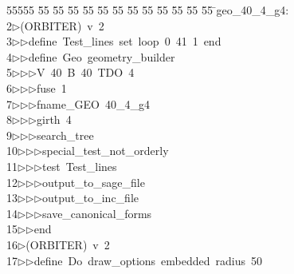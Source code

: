 %
%
\begin{tabbing}
55555 \= 55 \= 55 \= 55 \= 55 \= 55 \= 55 \= 55 \= 55 \= 55 \= 55 \= 55 \= 55 \= \>geo\_40\_4\_g4:\\[0pt]
2\>$\triangleright$\>(ORBITER)\ v\ 2\ \\[0pt]
3\>$\triangleright$\>$\triangleright$\>define\ Test\_lines\ set\ loop\ 0\ 41\ 1\ end\ \\[0pt]
4\>$\triangleright$\>$\triangleright$\>define\ Geo\ geometry\_builder\ \\[0pt]
5\>$\triangleright$\>$\triangleright$\>$\triangleright$\>V\ 40\ B\ 40\ TDO\ 4\ \\[0pt]
6\>$\triangleright$\>$\triangleright$\>$\triangleright$\>fuse\ 1\ \\[0pt]
7\>$\triangleright$\>$\triangleright$\>$\triangleright$\>fname\_GEO\ 40\_4\_g4\ \\[0pt]
8\>$\triangleright$\>$\triangleright$\>$\triangleright$\>girth\ 4\ \\[0pt]
9\>$\triangleright$\>$\triangleright$\>$\triangleright$\>search\_tree\ \\[0pt]
10\>$\triangleright$\>$\triangleright$\>$\triangleright$\>special\_test\_not\_orderly\ \\[0pt]
11\>$\triangleright$\>$\triangleright$\>$\triangleright$\>test\ Test\_lines\ \\[0pt]
12\>$\triangleright$\>$\triangleright$\>$\triangleright$\>output\_to\_sage\_file\ \\[0pt]
13\>$\triangleright$\>$\triangleright$\>$\triangleright$\>output\_to\_inc\_file\ \\[0pt]
14\>$\triangleright$\>$\triangleright$\>$\triangleright$\>save\_canonical\_forms\ \\[0pt]
15\>$\triangleright$\>$\triangleright$\>end\\[0pt]
16\>$\triangleright$\>(ORBITER)\ v\ 2\ \\[0pt]
17\>$\triangleright$\>$\triangleright$\>define\ Do\ draw\_options\ embedded\ radius\ 50\ \\[0pt]

\end{tabbing}
